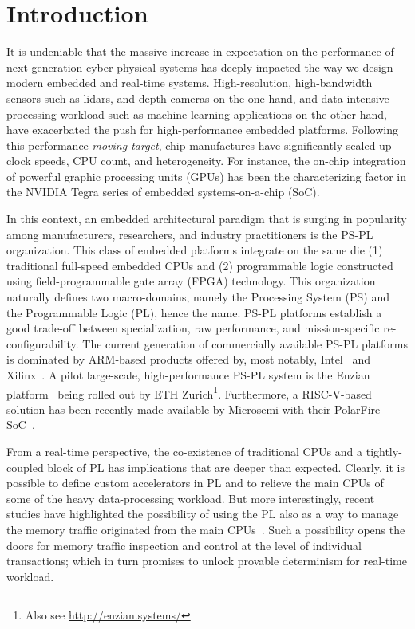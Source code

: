 \section{Introduction}

It is undeniable that the massive increase in expectation on the
performance of next-generation cyber-physical systems has deeply
impacted the way we design modern embedded and real-time
systems. High-resolution, high-bandwidth sensors such as lidars, and
depth cameras on the one hand, and data-intensive processing workload
such as machine-learning applications on the other hand, have
exacerbated the push for high-performance embedded
platforms. Following this performance \emph{moving target}, chip
manufactures have significantly scaled up clock speeds, CPU count, and
heterogeneity. For instance, the on-chip integration of powerful
graphic processing units (GPUs) has been the characterizing factor in
the NVIDIA Tegra series of embedded systems-on-a-chip (SoC).

In this context, an embedded architectural paradigm that is surging in
popularity among manufacturers, researchers, and industry
practitioners is the PS-PL organization. This class of embedded
platforms integrate on the same die (1) traditional full-speed
embedded CPUs and (2) programmable logic constructed using
field-programmable gate array (FPGA) technology. This organization
naturally defines two macro-domains, namely the Processing System (PS)
and the Programmable Logic (PL), hence the name. PS-PL platforms
establish a good trade-off between specialization, raw performance,
and mission-specific re-configurability. The current generation of
commercially available PS-PL platforms is dominated by ARM-based
products offered by, most notably, Intel~\cite{stratix10} and
Xilinx~\cite{ultrascale+}. A pilot large-scale, high-performance PS-PL
system is the Enzian platform~\cite{enzian20} being rolled out by ETH
Zurich\footnote{Also see \url{http://enzian.systems/}}. Furthermore, a
RISC-V-based solution has been recently made available by Microsemi
with their PolarFire SoC~\cite{icikle_kit}. 

From a real-time perspective, the co-existence of traditional CPUs and
a tightly-coupled block of PL has implications that are deeper than
expected. Clearly, it is possible to define custom accelerators in PL
and to relieve the main CPUs of some of the heavy data-processing
workload. But more interestingly, recent studies have highlighted the
possibility of using the PL also as a way to manage the memory traffic
originated from the main CPUs~\cite{lime_2018, PLIM20}. Such a
possibility opens the doors for memory traffic inspection and control
at the level of individual transactions; which in turn promises to
unlock provable determinism for real-time workload.

